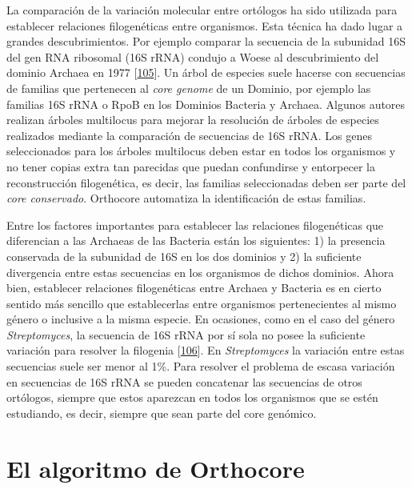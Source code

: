 \documentclass[12pt,twoside]{reedthesis}
\begin{document}
  La comparación de la variación molecular entre ortólogos ha sido
  utilizada para establecer relaciones filogenéticas entre organismos.
  Esta técnica ha dado lugar a grandes descubrimientos. Por ejemplo
  comparar la secuencia de la subunidad 16S del gen RNA ribosomal (16S
  rRNA) condujo a Woese al descubrimiento del dominio Archaea en 1977
  {[}\protect\hyperlink{ref-woese_phylogenetic_1977}{105}{]}. Un árbol de
  especies suele hacerse con secuencias de familias que pertenecen al
  \emph{core genome} de un Dominio, por ejemplo las familias 16S rRNA o
  RpoB en los Dominios Bacteria y Archaea. Algunos autores realizan
  árboles multilocus para mejorar la resolución de árboles de especies
  realizados mediante la comparación de secuencias de 16S rRNA. Los genes
  seleccionados para los árboles multilocus deben estar en todos los
  organismos y no tener copias extra tan parecidas que puedan confundirse
  y entorpecer la reconstrucción filogenética, es decir, las familias
  seleccionadas deben ser parte del \emph{core conservado}. Orthocore
  automatiza la identificación de estas familias.
  
  Entre los factores importantes para establecer las relaciones
  filogenéticas que diferencian a las Archaeas de las Bacteria están los
  siguientes: 1) la presencia conservada de la subunidad de 16S en los dos
  dominios y 2) la suficiente divergencia entre estas secuencias en los
  organismos de dichos dominios. Ahora bien, establecer relaciones
  filogenéticas entre Archaea y Bacteria es en cierto sentido más sencillo
  que establecerlas entre organismos pertenecientes al mismo género o
  inclusive a la misma especie. En ocasiones, como en el caso del género
  \emph{Streptomyces}, la secuencia de 16S rRNA por sí sola no posee la
  suficiente variación para resolver la filogenia
  {[}\protect\hyperlink{ref-labeda_phylogenetic_2017}{106}{]}. En
  \emph{Streptomyces} la variación entre estas secuencias suele ser menor
  al 1\%. Para resolver el problema de escasa variación en secuencias de
  16S rRNA se pueden concatenar las secuencias de otros ortólogos, siempre
  que estos aparezcan en todos los organismos que se estén estudiando, es
  decir, siempre que sean parte del core genómico.
  
  \section{El algoritmo de Orthocore}\label{el-algoritmo-de-orthocore}
  
\end{document}
